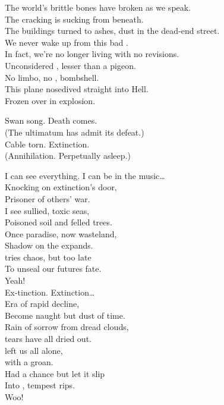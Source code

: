 The world's brittle bones have broken as we speak. \\
The cracking  is sucking from beneath. \\
The buildings turned to ashes, dust in the dead-end street. \\
We never wake up from this bad . \\

In fact, we're no longer living with no revisions. \\
Unconsidered , lesser than a pigeon. \\
No limbo, no , bombshell. \\
This plane nosedived straight into Hell. \\
Frozen over in explosion. \\


Swan song. Death comes. \\
(The ultimatum has admit its defeat.) \\
Cable torn. Extinction. \\
(Annihilation. Perpetually asleep.) \\




I can see everything. I can be in the music… \\

Knocking on extinction's door, \\
Prisoner of others' war. \\
I see sullied, toxic seas, \\
Poisoned soil and felled trees. \\
Once paradise, now wasteland, \\
Shadow on the  expands. \\
 tries chaos, but too late \\
To unseal our futures fate. \\
Yeah! \\

Ex-tinction. Extinction… \\

Era of rapid decline, \\
Become naught but dust of time. \\
Rain of sorrow from dread clouds, \\
 tears have all dried out. \\
 left us all alone, \\
 with a groan. \\
Had a chance but let it slip \\
Into , tempest rips. \\
Woo! \\

